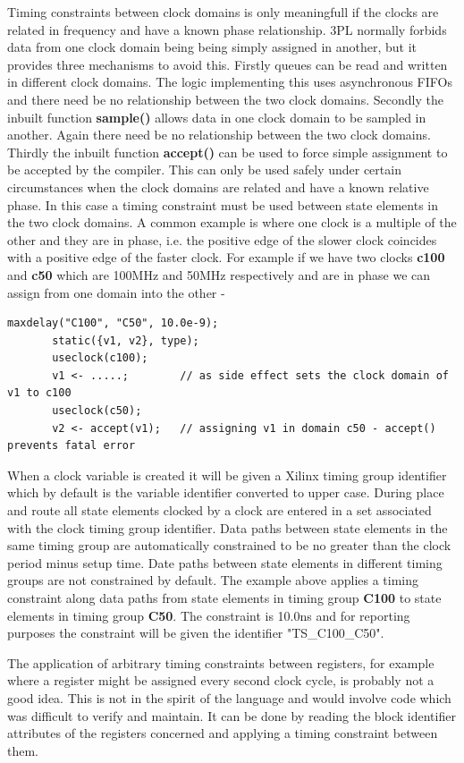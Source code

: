     Timing constraints between clock domains is only meaningfull if the clocks
    are related in frequency and have a known phase relationship. 3PL normally
    forbids data from one clock domain being being simply assigned in another,
    but it provides three mechanisms to avoid this. Firstly queues can be read
    and written in different clock domains. The logic implementing this uses
    asynchronous FIFOs and there need be no relationship between the two clock
    domains. Secondly the inbuilt function {\bf sample()} allows data in one
    clock domain to be sampled in another. Again there need be no relationship
    between the two clock domains. Thirdly the inbuilt function {\bf accept()}
    can be used to force simple assignment to be accepted by the compiler. This
    can only be used safely under certain circumstances when the clock domains
    are related and have a known relative phase. In this case a timing
    constraint must be used between state elements in the two clock domains. A
    common example is where one clock is a multiple of the other and they are in
    phase, i.e. the positive edge of the slower clock coincides with a positive
    edge of the faster clock. For example if we have two clocks {\bf c100} and
    {\bf c50} which are 100MHz and 50MHz respectively and are in phase we can
    assign from one domain into the other -
    \begin{lstlisting}[gobble=4, language=threepl]
       maxdelay("C100", "C50", 10.0e-9);
       static({v1, v2}, type);
       useclock(c100);
       v1 <- .....;        // as side effect sets the clock domain of v1 to c100
       useclock(c50);
       v2 <- accept(v1);   // assigning v1 in domain c50 - accept() prevents fatal error
    \end{lstlisting}
    
    When a clock variable is created it will be given a Xilinx timing group
    identifier which by default is the variable identifier converted to upper
    case. During place and route all state elements clocked by a clock are
    entered in a set associated with the clock timing group identifier. Data
    paths between state elements in the same timing group are automatically
    constrained to be no greater than the clock period minus setup time. Date
    paths between state elements in different timing groups are not constrained
    by default. The example above applies a timing constraint along data paths
    from state elements in timing group {\bf C100} to state elements in timing
    group {\bf C50}. The constraint is 10.0ns and for reporting purposes the
    constraint will be given the identifier "TS\_C100\_C50".

    The application of arbitrary timing constraints between registers, for
    example where a register might be assigned every second clock cycle, is
    probably not a good idea. This is not in the spirit of the language and
    would involve code which was difficult to verify and maintain. It can be
    done by reading the block identifier attributes of the registers concerned
    and applying a timing constraint between them.
